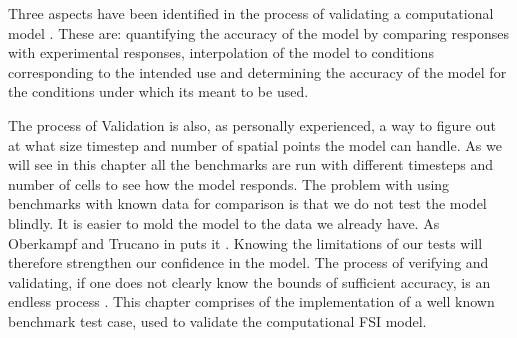Three aspects have been identified in the process of validating a computational model \cite{oberkampf2008verification}. These are: quantifying the accuracy of the model by comparing responses with experimental responses, interpolation of the model to conditions corresponding to the intended use and determining the accuracy of the model for the conditions under which its meant to be used. \newline

The process of Validation is also, as personally experienced, a way to figure out at what size timestep and number of spatial points the model can handle. As we will see in this chapter all the benchmarks are run with different timesteps and number of cells to see how the model responds. The problem with using benchmarks with known data for comparison is that we do not test the model blindly. It is easier to mold the model to the data we already have. As Oberkampf and Trucano in \cite{oberkampf2008verification} puts it . Knowing the limitations of our tests will therefore strengthen our confidence in the model. The process of verifying and validating, if one does not clearly know the bounds of sufficient accuracy, is an endless process \cite{oberkampf2008verification}. 
This chapter comprises of the implementation of a well known benchmark test case, used to validate the computational FSI model.


%











